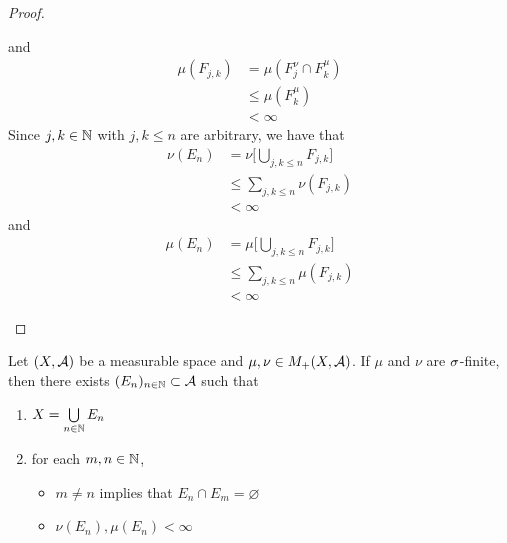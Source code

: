 \documentclass{book}
\begin{document}
\begin{proof}
\begin{enumerate}
\begin{itemize}
				and 
				\begin{align*}
					\mu(F_{j,k})
					& = \mu( F^{\nu}_j \cap F^{\mu}_k ) \\
					& \leq \mu(F^{\mu}_k) \\
					& < \infty 
				\end{align*}
				Since $j,k \in \mathbb{N}$ with $j,k \leq n$ are arbitrary, we have that
				\begin{align*}
					\nu(E_n)
					& = \nu \bigg[ \bigcup\limits_{j,k \leq n} F_{j, k} \bigg] \\
					& \leq \sum\limits_{j,k \leq n} \nu(F_{j, k}) \\
					& < \infty 
				\end{align*}
				and 
				\begin{align*}
					\mu(E_n)
					& = \mu \bigg[ \bigcup\limits_{j,k \leq n} F_{j, k} \bigg] \\
					& \leq \sum\limits_{j,k \leq n} \mu(F_{j, k}) \\
					& < \infty 
				\end{align*}
			\end{itemize}
		\end{enumerate}
	\end{proof}

	\begin{ex} 
		Let $(X, \mathcal{A})$ be a measurable space and $\mu, \nu \in M_+(X, \mathcal{A})$. If $\mu$ and $\nu$ are $\sigma$-finite, then there exists $(E_n)_{n \in \mathbb{N}} \subset \mathcal{A}$ such that 
		\begin{enumerate}
			\item $X = \bigcup\limits_{n \in \mathbb{N}} E_n$
			\item for each $m,n \in \mathbb{N}$,
			\begin{itemize}
				\item $m \neq n$ implies that $E_n \cap E_m = \varnothing$
				\item $\nu(E_n), \mu(E_n) < \infty$
			\end{itemize}
		\end{enumerate} 
	\end{ex}
\end{document}
